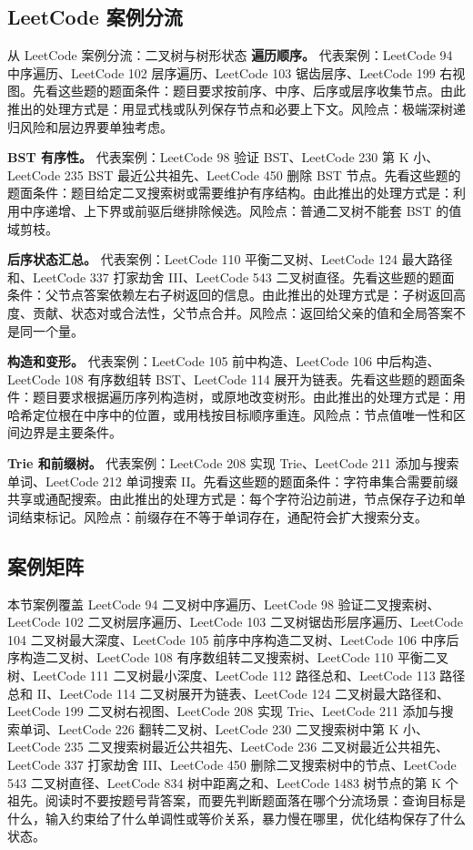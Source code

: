 \subsection{LeetCode 案例分流}

\begin{principlebox}{从 LeetCode 案例分流：二叉树与树形状态}
\textbf{遍历顺序。}
代表案例：LeetCode 94 中序遍历、LeetCode 102 层序遍历、LeetCode 103 锯齿层序、LeetCode 199 右视图。先看这些题的题面条件：题目要求按前序、中序、后序或层序收集节点。由此推出的处理方式是：用显式栈或队列保存节点和必要上下文。风险点：极端深树递归风险和层边界要单独考虑。

\textbf{BST 有序性。}
代表案例：LeetCode 98 验证 BST、LeetCode 230 第 K 小、LeetCode 235 BST 最近公共祖先、LeetCode 450 删除 BST 节点。先看这些题的题面条件：题目给定二叉搜索树或需要维护有序结构。由此推出的处理方式是：利用中序递增、上下界或前驱后继排除候选。风险点：普通二叉树不能套 BST 的值域剪枝。

\textbf{后序状态汇总。}
代表案例：LeetCode 110 平衡二叉树、LeetCode 124 最大路径和、LeetCode 337 打家劫舍 III、LeetCode 543 二叉树直径。先看这些题的题面条件：父节点答案依赖左右子树返回的信息。由此推出的处理方式是：子树返回高度、贡献、状态对或合法性，父节点合并。风险点：返回给父亲的值和全局答案不是同一个量。

\textbf{构造和变形。}
代表案例：LeetCode 105 前中构造、LeetCode 106 中后构造、LeetCode 108 有序数组转 BST、LeetCode 114 展开为链表。先看这些题的题面条件：题目要求根据遍历序列构造树，或原地改变树形。由此推出的处理方式是：用哈希定位根在中序中的位置，或用栈按目标顺序重连。风险点：节点值唯一性和区间边界是主要条件。

\textbf{Trie 和前缀树。}
代表案例：LeetCode 208 实现 Trie、LeetCode 211 添加与搜索单词、LeetCode 212 单词搜索 II。先看这些题的题面条件：字符串集合需要前缀共享或通配搜索。由此推出的处理方式是：每个字符沿边前进，节点保存子边和单词结束标记。风险点：前缀存在不等于单词存在，通配符会扩大搜索分支。

\end{principlebox}

\subsection{案例矩阵}

本节案例覆盖 LeetCode 94 二叉树中序遍历、LeetCode 98 验证二叉搜索树、LeetCode 102 二叉树层序遍历、LeetCode 103 二叉树锯齿形层序遍历、LeetCode 104 二叉树最大深度、LeetCode 105 前序中序构造二叉树、LeetCode 106 中序后序构造二叉树、LeetCode 108 有序数组转二叉搜索树、LeetCode 110 平衡二叉树、LeetCode 111 二叉树最小深度、LeetCode 112 路径总和、LeetCode 113 路径总和 II、LeetCode 114 二叉树展开为链表、LeetCode 124 二叉树最大路径和、LeetCode 199 二叉树右视图、LeetCode 208 实现 Trie、LeetCode 211 添加与搜索单词、LeetCode 226 翻转二叉树、LeetCode 230 二叉搜索树中第 K 小、LeetCode 235 二叉搜索树最近公共祖先、LeetCode 236 二叉树最近公共祖先、LeetCode 337 打家劫舍 III、LeetCode 450 删除二叉搜索树中的节点、LeetCode 543 二叉树直径、LeetCode 834 树中距离之和、LeetCode 1483 树节点的第 K 个祖先。阅读时不要按题号背答案，而要先判断题面落在哪个分流场景：查询目标是什么，输入约束给了什么单调性或等价关系，暴力慢在哪里，优化结构保存了什么状态。

